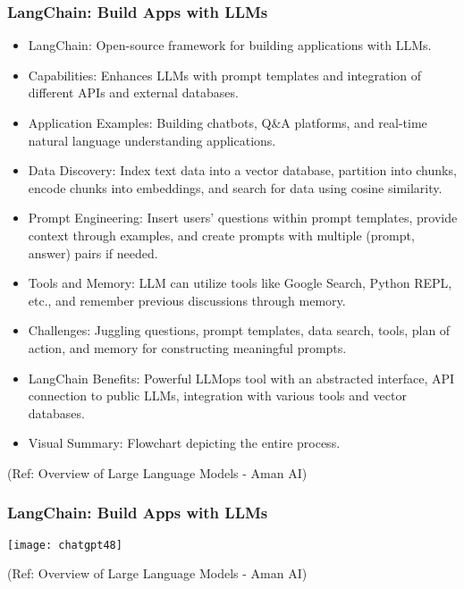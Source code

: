 \begin{frame}[fragile]\frametitle{LangChain: Build Apps with LLMs}

\begin{itemize}
\item LangChain: Open-source framework for building applications with LLMs.
\item Capabilities: Enhances LLMs with prompt templates and integration of different APIs and external databases.
\item Application Examples: Building chatbots, Q\&A platforms, and real-time natural language understanding applications.
\item Data Discovery: Index text data into a vector database, partition into chunks, encode chunks into embeddings, and search for data using cosine similarity.
\item Prompt Engineering: Insert users' questions within prompt templates, provide context through examples, and create prompts with multiple (prompt, answer) pairs if needed.
\item Tools and Memory: LLM can utilize tools like Google Search, Python REPL, etc., and remember previous discussions through memory.
\item Challenges: Juggling questions, prompt templates, data search, tools, plan of action, and memory for constructing meaningful prompts.
\item LangChain Benefits: Powerful LLMops tool with an abstracted interface, API connection to public LLMs, integration with various tools and vector databases.
\item Visual Summary: Flowchart depicting the entire process.
\end{itemize}

{\tiny (Ref: Overview of Large Language Models - Aman AI)}

\end{frame}

\begin{frame}[fragile]\frametitle{LangChain: Build Apps with LLMs}

		\begin{center}
		\texttt{[image: chatgpt48]}
		\end{center}
		
{\tiny (Ref: Overview of Large Language Models - Aman AI)}

\end{frame}

